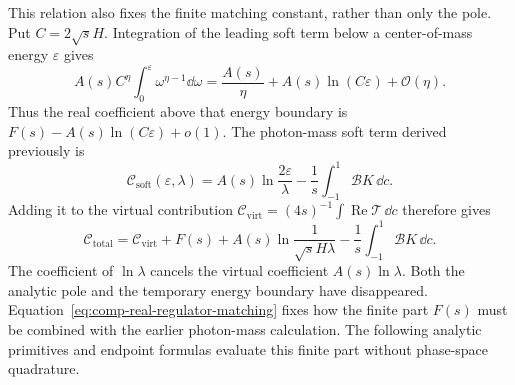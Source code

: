 This relation also fixes the finite matching constant, rather than
only the pole. Put $C=2\sqrt{s}H$. Integration of the leading soft
term below a center-of-mass energy $\varepsilon$ gives
\begin{equation}
 A(s)C^\eta\int_0^\varepsilon\omega^{\eta-1}\dd\omega
 =\frac{A(s)}\eta+A(s)\ln(C\varepsilon)+\mathcal O(\eta).
\end{equation}
Thus the real coefficient above that energy boundary is
$F(s)-A(s)\ln(C\varepsilon)+o(1)$.
The photon-mass soft term derived previously is
\begin{equation}
 \mathcal C_{\mathrm{soft}}(\varepsilon,\lambda)
 =A(s)\ln\frac{2\varepsilon}{\lambda}
                  -\frac1s\int_{-1}^1\mathcal B K\,\dd c.
\end{equation}
Adding it to the virtual contribution
$\mathcal C_{\mathrm{virt}}=(4s)^{-1}\int\operatorname{Re}\mathcal T\,\dd c$
therefore gives
\begin{equation}
 \mathcal C_{\mathrm{total}}
 =\mathcal C_{\mathrm{virt}}+F(s)
   +A(s)\ln\frac1{\sqrt{s}H\lambda}
   -\frac1s\int_{-1}^1\mathcal B K\,\dd c.
 \label{eq:comp-real-regulator-matching}
\end{equation}
The coefficient of $\ln\lambda$ cancels the virtual coefficient
$A(s)\ln\lambda$. Both the analytic pole and the temporary energy
boundary have disappeared. Equation~\eqref{eq:comp-real-regulator-matching}
fixes how the finite part $F(s)$ must be combined with the earlier
photon-mass calculation. The following analytic primitives and endpoint formulas evaluate
this finite part without phase-space quadrature.

